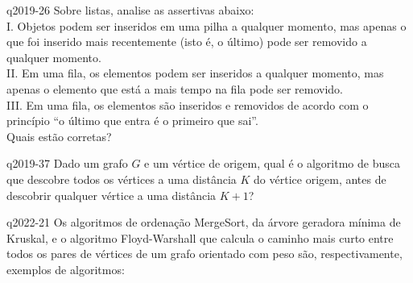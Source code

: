 \documentclass[10pt,a4paper]{article}
\begin{document}
{
\def\AMCbeginQuestion#1#2{\par\noindent{\bf (POSCOMP 2019 - Questão 26)}}
\begin{question}{q2019-26} Sobre listas, analise as assertivas abaixo:\\
I. Objetos podem ser inseridos em uma pilha a qualquer momento, mas apenas o que foi inserido mais recentemente (isto é, o último) pode ser removido a qualquer momento.\\
II. Em uma fila, os elementos podem ser inseridos a qualquer momento, mas apenas o elemento que está a mais tempo na fila pode ser removido.\\
III. Em uma fila, os elementos são inseridos e removidos de acordo com o princípio ``o último que entra é o primeiro que sai''.\\
Quais estão corretas?
\begin{choices}
\end{choices}
\end{question}
}

{
\def\AMCbeginQuestion#1#2{\par\noindent{\bf (POSCOMP 2019 - Questão 37)}}
\begin{question}{q2019-37} Dado um grafo $G$ e um vértice de origem, qual é o algoritmo de busca que descobre todos os vértices a uma distância $K$ do vértice origem, antes de descobrir qualquer vértice a uma distância $K+1$?
\begin{choices}
\end{choices}
\end{question}
}

{
\def\AMCbeginQuestion#1#2{\par\noindent{\bf (POSCOMP 2022 - Questão 21)}}
\begin{question}{q2022-21} Os algoritmos de ordenação MergeSort, da árvore geradora mínima de Kruskal, e o algoritmo Floyd-Warshall que calcula o caminho mais curto entre todos os pares de vértices de um grafo orientado com peso são, respectivamente, exemplos de algoritmos:
\begin{choices}
\end{choices}
\end{question}
}
\end{document}
